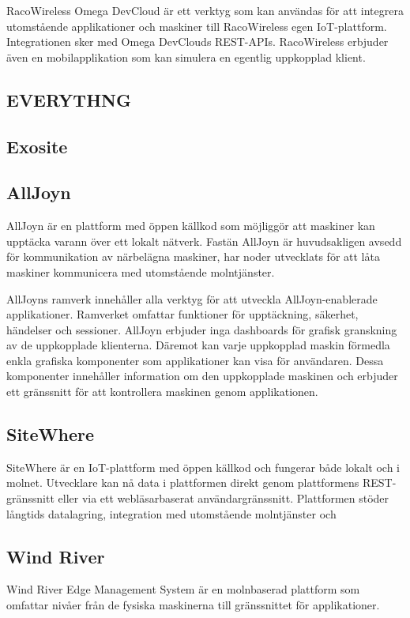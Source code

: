 RacoWireless Omega DevCloud är ett verktyg som kan användas för att
integrera utomstående applikationer och maskiner till RacoWireless egen 
IoT-plattform. Integrationen sker med Omega DevClouds REST-APIs. RacoWireless
erbjuder även en mobilapplikation som kan simulera en egentlig 
uppkopplad klient. \cite{racowireless}


\subsection{EVERYTHNG}

\subsection{Exosite}


\subsection{AllJoyn}
AllJoyn är en plattform med öppen källkod som möjliggör att maskiner kan
upptäcka varann över ett lokalt nätverk. Fastän AllJoyn är huvudsakligen
avsedd för kommunikation av närbelägna maskiner, har noder utvecklats för att
låta maskiner kommunicera med utomstående molntjänster. \cite{alljoyn}

AllJoyns ramverk innehåller alla verktyg för att utveckla AllJoyn-enablerade
applikationer. Ramverket omfattar funktioner för upptäckning, säkerhet, 
händelser och sessioner. AllJoyn erbjuder inga dashboards för grafisk
granskning av de uppkopplade klienterna. Däremot kan varje uppkopplad maskin
förmedla enkla grafiska komponenter som applikationer kan visa för användaren.
Dessa komponenter innehåller information om den uppkopplade maskinen och
erbjuder ett gränssnitt för att kontrollera maskinen genom applikationen.
\cite{alljoyn}



\subsection{SiteWhere}
SiteWhere är en IoT-plattform med öppen källkod och fungerar både lokalt
och i molnet. Utvecklare kan nå data i plattformen direkt genom plattformens
REST-gränssnitt eller via ett webläsarbaserat användargränssnitt. Plattformen
stöder långtids datalagring, integration med utomstående molntjänster och


\subsection{Wind River}
Wind River Edge Management System är en molnbaserad plattform som omfattar
nivåer från de fysiska maskinerna till gränssnittet för applikationer.
\cite{windriver}



